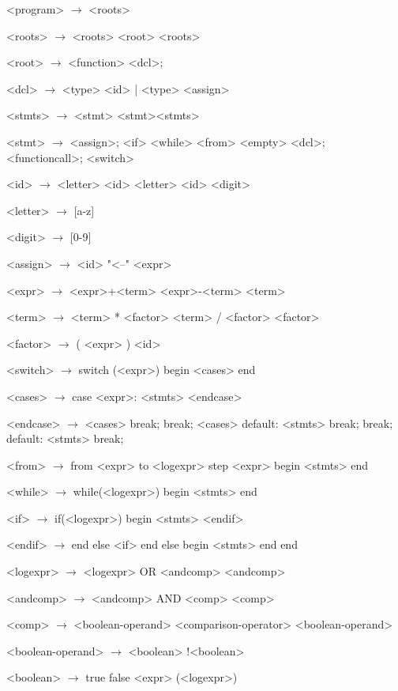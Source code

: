 \documentclass{article}
\begin{document}
\begin{grammar}
<program> $\rightarrow$ <roots>

<roots> $\rightarrow$ <roots>
\alt <root> <roots>

<root> $\rightarrow$ <function>
\alt <dcl>;

<dcl> $\rightarrow$ <type> <id>
| <type> <assign>

<stmts> $\rightarrow$ <stmt>
	\alt <stmt><stmts>

<stmt> $\rightarrow$ <assign>;
	\alt <if>
	\alt <while>
	\alt <from>
	\alt <empty>
	\alt <dcl>;
	\alt <functioncall>;
	\alt <switch>

<id> $\rightarrow$ <letter>
	\alt<id> <letter>
	\alt<id> <digit>

<letter> $\rightarrow$ [a-z]
	\alt [A-Z]

<digit> $\rightarrow$ [0-9]

<assign>  $\rightarrow$ <id> "<--" <expr>

<expr> $\rightarrow$ <expr>+<term>
	\alt<expr>-<term>
	\alt<term>

<term> $\rightarrow$ <term> * <factor>
	\alt <term> / <factor>
	\alt <factor>

<factor> $\rightarrow$ ( <expr> )
	\alt <id>

<switch> $\rightarrow$ switch (<expr>)
		begin
			<cases>
		end

<cases> $\rightarrow$ case <expr>:
			<stmts>
		<endcase>
		
<endcase> $\rightarrow$ <cases>
		\alt break;
		\alt break;
		<cases>
		\alt default:
			<stmts>
			break;
		\alt break;
		default:
			<stmts>
			break;

<from> $\rightarrow$ from <expr> to <logexpr> step <expr>
	begin
		<stmts>
	end 

<while> $\rightarrow$ while(<logexpr>)
		begin
			<stmts>
		end

<if> $\rightarrow$ if(<logexpr>)
	begin
		<stmts>
	<endif>

<endif> $\rightarrow$ end
	else <if>
	\alt end
	else
	begin
		<stmts>
	end
	\alt end

<logexpr> $\rightarrow$ <logexpr> OR <andcomp>
		\alt <andcomp>

<andcomp> $\rightarrow$ <andcomp> AND <comp>

<comp> $\rightarrow$ <boolean-operand> <comparison-operator> <boolean-operand>

<boolean-operand> $\rightarrow$ <boolean>
		\alt !<boolean>

<boolean> $\rightarrow$ true
		\alt false
		\alt (<logexpr>)


\end{grammar}
\end{document}
